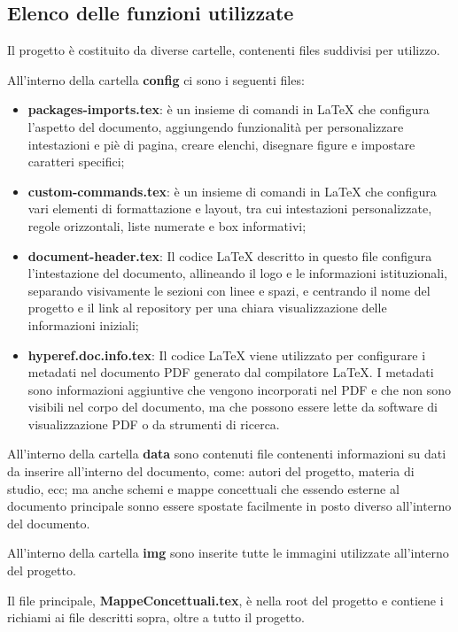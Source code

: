 \documentclass[portrait,a4paper]{article} %
\begin{document}
\subsection{Elenco delle funzioni utilizzate} 
Il progetto è costituito da diverse cartelle, contenenti files suddivisi per utilizzo.
\par
All’interno della cartella \textbf{config} ci sono i seguenti files:
\begin{itemize}
    \item \textbf{packages-imports.tex}: è un insieme di comandi in LaTeX che configura l'aspetto del documento, aggiungendo funzionalità per personalizzare intestazioni e piè di pagina, creare elenchi, disegnare figure e impostare caratteri specifici;
    \item \textbf{custom-commands.tex}: è un insieme di comandi in LaTeX che configura vari elementi di formattazione e layout, tra cui intestazioni personalizzate, regole orizzontali, liste numerate e box informativi; 
    \item \textbf{document-header.tex}: Il codice LaTeX descritto in questo file configura l’intestazione del documento, allineando il logo e le informazioni istituzionali, separando visivamente le sezioni con linee e spazi, e centrando il nome del progetto e il link al repository per una chiara visualizzazione delle informazioni iniziali;
    \item \textbf{hyperef.doc.info.tex}: Il codice LaTeX viene utilizzato per configurare i metadati nel documento PDF generato dal compilatore LaTeX. I metadati sono informazioni aggiuntive che vengono incorporati nel PDF e che non sono visibili nel corpo del documento, ma che possono essere lette da software di visualizzazione PDF o da strumenti di ricerca.
\end{itemize}
\par
All’interno della cartella \textbf{data} sono contenuti file contenenti informazioni su dati da inserire all’interno del documento, come: autori del progetto, materia di studio, ecc; ma anche schemi e mappe concettuali che essendo esterne al documento principale sonno essere spostate facilmente in posto diverso all’interno del documento.
\par
All’interno della cartella \textbf{img} sono inserite tutte le immagini utilizzate all’interno del progetto.
\par
Il file principale, \textbf{MappeConcettuali.tex}, è nella root del progetto e contiene i richiami ai file descritti sopra, oltre a tutto il progetto.\\
\end{document}
